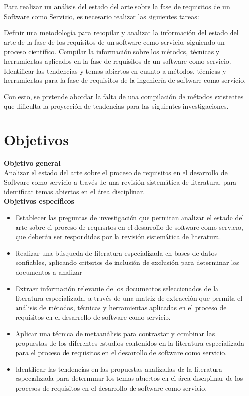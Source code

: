\documentclass{article}
\begin{document}
Para realizar un análisis del estado del arte sobre la fase de requisitos de un Software como Servicio, es necesario realizar las siguientes tareas:

Definir una metodología para recopilar y analizar la información del estado del arte de la fase de los requisitos de un software como servicio, siguiendo un proceso científico.
Compilar la información sobre los métodos, técnicas y herramientas aplicados en la fase de requisitos de un software como servicio.
Identificar las tendencias y temas abiertos en cuanto a métodos, técnicas y herramientas para la fase de requisitos de la ingeniería de software como servicio.

Con esto, se pretende abordar la falta de una compilación de métodos existentes que dificulta la proyección de tendencias para las siguientes investigaciones. 

\newpage

\section{Objetivos}
\textbf{Objetivo general} \\

Analizar el estado del arte sobre el proceso de requisitos en el desarrollo de Software como servicio a través de una revisión sistemática de literatura, para identificar temas abiertos en el área disciplinar. \\

\textbf{Objetivos específicos} \\

\begin{itemize}
    \item Establecer las preguntas de investigación que permitan analizar el estado del arte sobre el proceso de requisitos en el desarrollo de software como servicio, que deberán ser respondidas por la revisión sistemática de literatura.
    \item Realizar una búsqueda de literatura especializada en bases de datos confiables, aplicando criterios de inclusión de exclusión para determinar los documentos a analizar.
    \item Extraer información relevante de los documentos seleccionados de la literatura especializada, a través de una matriz de extracción que permita el análisis de métodos, técnicas y herramientas aplicadas en el proceso de requisitos en el desarrollo de software como servicio.
    \item Aplicar una técnica de metaanálisis para contrastar y combinar las propuestas de los diferentes estudios contenidos en la literatura especializada para el proceso de requisitos en el desarrollo de software como servicio.
    \item Identificar las tendencias en las propuestas analizadas de la literatura especializada para determinar los temas abiertos en el área disciplinar de los procesos de requisitos en el desarrollo de software como servicio.
\end{itemize}
\end{document}
